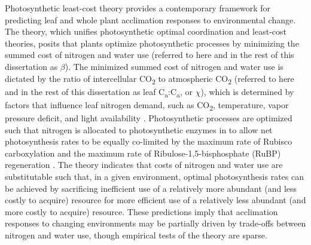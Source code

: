 Photosynthetic least-cost theory  provides a contemporary framework for predicting leaf and whole plant acclimation responses to environmental change. The theory, which unifies photosynthetic optimal coordination  and least-cost  theories, posits that plants optimize photosynthetic processes by minimizing the summed cost of nitrogen and water use (referred to here and in the rest of this dissertation as $\beta$). The minimized summed cost of nitrogen and water use is dictated by the ratio of intercellular CO\textsubscript{2} to atmospheric CO\textsubscript{2} (referred to here and in the rest of this dissertation as leaf C\textsubscript{a}:C\textsubscript{a}, or $\chi$), which is determined by factors that influence leaf nitrogen demand, such as CO\textsubscript{2}, temperature, vapor pressure deficit, and light availability . Photosynthetic processes are optimized such that nitrogen is allocated to photosynthetic enzymes in to allow net photosynthesis rates to be equally co-limited by the maximum rate of Rubisco carboxylation and the maximum rate of Ribulose-1,5-bisphosphate (RuBP) regeneration . The theory indicates that costs of nitrogen and water use are substitutable such that, in a given environment, optimal photosynthesis rates can be achieved by sacrificing inefficient use of a relatively more abundant (and less costly to acquire) resource for more efficient use of a relatively less abundant (and more costly to acquire) resource. These predictions imply that acclimation responses to changing environments may be partially driven by trade-offs between nitrogen and water use, though empirical tests of the theory are sparse.

